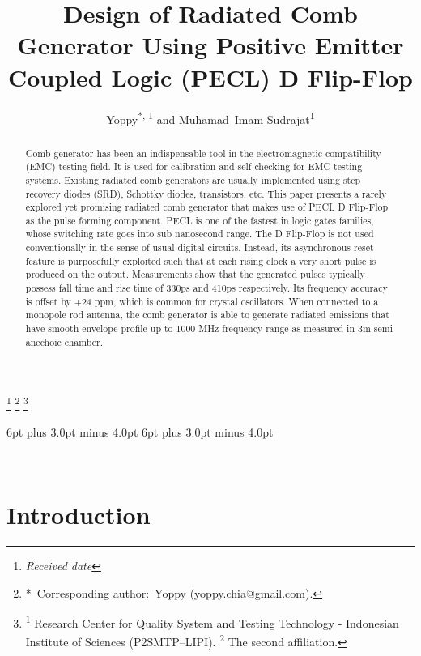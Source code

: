 \documentclass{pj}
\begin{document}
\setcounter{page}{1}


\title[Design of Radiated Comb Generator]
{Design of Radiated Comb Generator Using Positive Emitter Coupled Logic (PECL) D Flip-Flop}
\footnote{\it Received date}  \footnote{\hskip-0.12in*\, Corresponding author:~Yoppy (yoppy.chia@gmail.com).}
\footnote{\hskip-0.12in\textsuperscript{1} Research Center for Quality System and Testing Technology - Indonesian Institute of Sciences (P2SMTP--LIPI). \textsuperscript{2} The second affiliation.}

\author{Yoppy\textsuperscript{*, 1} and Muhamad~Imam Sudrajat\textsuperscript{1}}




\begin{abstract}
Comb generator has been an indispensable tool in the electromagnetic compatibility (EMC) testing field. It is used for calibration and self checking for EMC testing systems. Existing radiated comb generators are usually implemented using step recovery diodes (SRD), Schottky diodes, transistors, etc. This paper presents a rarely explored yet promising radiated comb generator that makes use of PECL D Flip-Flop as the pulse forming component. PECL is one of the fastest in logic gates families, whose switching rate goes into sub nanosecond range. The D Flip-Flop is not used conventionally in the sense of usual digital circuits. Instead, its asynchronous reset feature is purposefully exploited such that at each rising clock a very short pulse is produced on the output. Measurements show that the generated pulses typically possess fall time and rise time of 330ps and 410ps respectively. Its frequency accuracy is offset by +24 ppm, which is common for crystal oscillators. When connected to a monopole rod antenna, the comb generator is able to generate radiated emissions that have smooth envelope profile up to 1000 MHz frequency range as measured in 3m semi anechoic chamber.
\end{abstract}


\setlength {\abovedisplayskip} {6pt plus 3.0pt minus 4.0pt}
\setlength {\belowdisplayskip} {6pt plus 3.0pt minus 4.0pt}

\

\section{Introduction}
\label{sect:introduction}
\end{document}
